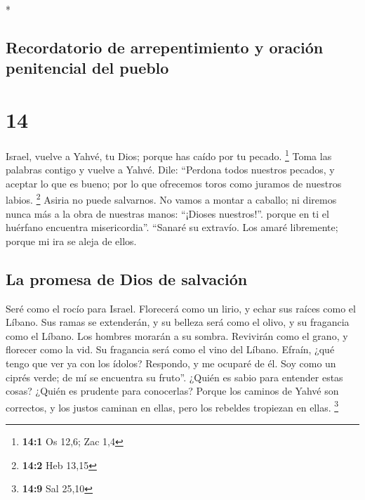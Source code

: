 \begin{paracol}{2}
\switchcolumn[0]*

\hypertarget{recordatorio-de-arrepentimiento-y-oraciuxf3n-penitencial-del-pueblo}{%
\subsection{Recordatorio de arrepentimiento y oración penitencial del
pueblo}\label{recordatorio-de-arrepentimiento-y-oraciuxf3n-penitencial-del-pueblo}}

\hypertarget{section-26}{%
\section{14}\label{section-26}}

 Israel, vuelve a Yahvé, tu Dios; porque has caído por tu
pecado. \footnote{\textbf{14:1} Os 12,6; Zac 1,4}  Toma
las palabras contigo y vuelve a Yahvé. Dile: ``Perdona todos nuestros
pecados, y aceptar lo que es bueno; por lo que ofrecemos toros como
juramos de nuestros labios. \footnote{\textbf{14:2} Heb 13,15}
 Asiria no puede salvarnos. No vamos a montar a caballo;
ni diremos nunca más a la obra de nuestras manos: ``¡Dioses nuestros!''.
porque en ti el huérfano encuentra misericordia''. 
``Sanaré su extravío. Los amaré libremente; porque mi ira se aleja de
ellos.

\hypertarget{la-promesa-de-dios-de-salvaciuxf3n}{%
\subsection{La promesa de Dios de
salvación}\label{la-promesa-de-dios-de-salvaciuxf3n}}

 Seré como el rocío para Israel. Florecerá como un lirio,
y echar sus raíces como el Líbano.  Sus ramas se
extenderán, y su belleza será como el olivo, y su fragancia como el
Líbano.  Los hombres morarán a su sombra. Revivirán como
el grano, y florecer como la vid. Su fragancia será como el vino del
Líbano.  Efraín, ¿qué tengo que ver ya con los ídolos?
Respondo, y me ocuparé de él. Soy como un ciprés verde; de mí se
encuentra su fruto''.  ¿Quién es sabio para entender estas
cosas? ¿Quién es prudente para conocerlas? Porque los caminos de Yahvé
son correctos, y los justos caminan en ellas, pero los rebeldes
tropiezan en ellas. \footnote{\textbf{14:9} Sal 25,10} \switchcolumn
\begin{otherlanguage}{english}


\end{otherlanguage}
\end{paracol}
